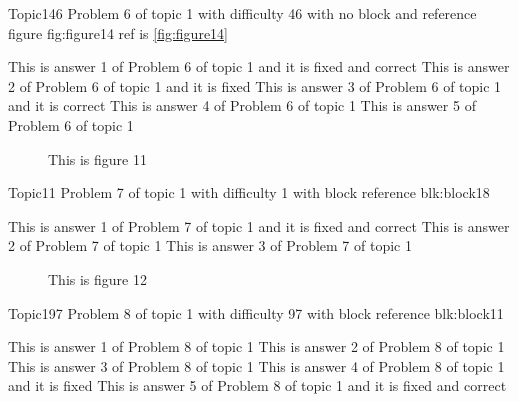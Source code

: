 \documentclass[master]{exam}
\begin{document}
\begin{problem}{Topic1}{46}
	Problem 6 of topic 1 with difficulty 46 with no block and reference figure fig:figure14 ref is \ref{fig:figure14}
	\begin{answers}
		 This is answer 1 of Problem 6 of topic 1 and it is fixed and correct
		\answer[fixed] This is answer 2 of Problem 6 of topic 1 and it is fixed
		\answer[correct] This is answer 3 of Problem 6 of topic 1 and it is correct
		\answer This is answer 4 of Problem 6 of topic 1 
		\answer This is answer 5 of Problem 6 of topic 1 
	\end{answers}
\end{problem}



\begin{figure}
	\begin{center}
		This is figure 11 
		\label{fig:figure11}
	\end{center}
\end{figure}

\begin{problem}[requires=blk:block18]{Topic1}{1}
	Problem 7 of topic 1 with difficulty 1 with block reference blk:block18
	\begin{answers}
		 This is answer 1 of Problem 7 of topic 1 and it is fixed and correct
		\answer This is answer 2 of Problem 7 of topic 1 
		\answer This is answer 3 of Problem 7 of topic 1 
	\end{answers}
\end{problem}



\begin{figure}
	\begin{center}
		This is figure 12 
		\label{fig:figure12}
	\end{center}
\end{figure}

\begin{problem}[requires=blk:block11]{Topic1}{97}
	Problem 8 of topic 1 with difficulty 97 with block reference blk:block11
	\begin{answers}
		\answer This is answer 1 of Problem 8 of topic 1 
		\answer This is answer 2 of Problem 8 of topic 1 
		\answer This is answer 3 of Problem 8 of topic 1 
		\answer[fixed] This is answer 4 of Problem 8 of topic 1 and it is fixed
		 This is answer 5 of Problem 8 of topic 1 and it is fixed and correct
	\end{answers}
\end{problem}
\end{document}
